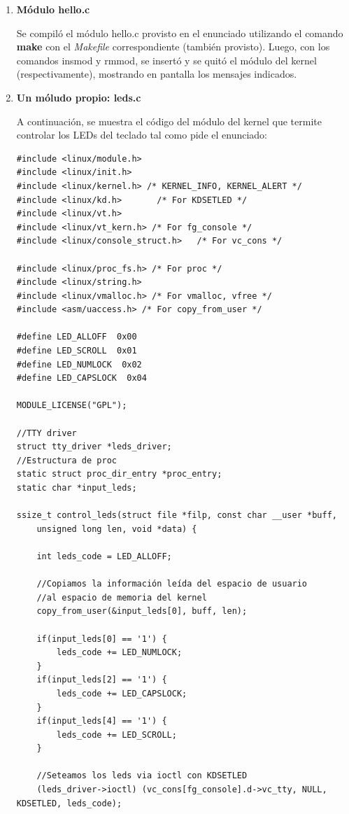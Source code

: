 \documentclass[a4paper,11pt] {article}
\begin{document}
\begin{enumerate}
	\item \textbf{Módulo hello.c}

	Se compiló el módulo hello.c provisto en el enunciado utilizando el comando \textbf{make} con el \textit{Makefile} correspondiente (también provisto). Luego, con los comandos insmod y rmmod, se insertó y se quitó el módulo del kernel (respectivamente), mostrando en pantalla los mensajes indicados.

	\item \textbf{Un móludo propio: leds.c}

	A continuación, se muestra el código del módulo del kernel que termite controlar los LEDs del teclado tal como pide el enunciado:

	\begin{verbatim}
#include <linux/module.h>
#include <linux/init.h>
#include <linux/kernel.h> /* KERNEL_INFO, KERNEL_ALERT */
#include <linux/kd.h>		/* For KDSETLED */
#include <linux/vt.h>
#include <linux/vt_kern.h> /* For fg_console */
#include <linux/console_struct.h>	/* For vc_cons */

#include <linux/proc_fs.h> /* For proc */
#include <linux/string.h>
#include <linux/vmalloc.h> /* For vmalloc, vfree */
#include <asm/uaccess.h> /* For copy_from_user */

#define LED_ALLOFF  0x00
#define LED_SCROLL  0x01
#define LED_NUMLOCK  0x02
#define LED_CAPSLOCK  0x04

MODULE_LICENSE("GPL");

//TTY driver
struct tty_driver *leds_driver;
//Estructura de proc
static struct proc_dir_entry *proc_entry;
static char *input_leds;

ssize_t control_leds(struct file *filp, const char __user *buff, 
    unsigned long len, void *data) {

    int leds_code = LED_ALLOFF;
    
    //Copiamos la información leída del espacio de usuario
    //al espacio de memoria del kernel
    copy_from_user(&input_leds[0], buff, len);
    
    if(input_leds[0] == '1') {
        leds_code += LED_NUMLOCK;
    }
    if(input_leds[2] == '1') {
        leds_code += LED_CAPSLOCK;
    }
    if(input_leds[4] == '1') {
        leds_code += LED_SCROLL;
    }
    
    //Seteamos los leds via ioctl con KDSETLED
    (leds_driver->ioctl) (vc_cons[fg_console].d->vc_tty, NULL, KDSETLED, leds_code);
    

\end{verbatim}
\end{enumerate}
\end{document}
